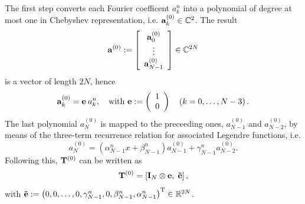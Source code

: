 The first step converts each Fourier coefficent $a_{k}^n$ into a polynomial of degree at most one in Chebyshev representation, i.e. $\mathbf{a}_{k}^{(0)} \in \mathbb{C}^2$. The result 
\[
  \mathbf{a}^{(0)} := 
    \left[\begin{array}{c}
      \mathbf{a}_{0}^{(0)}\\
      \vdots\\
      \mathbf{a}_{N-1}^{(0)}
    \end{array}\right] 
    \in \mathbb{C}^{2N}
\] 
is a vector of length $2N$, hence 
\[ 
  \mathbf{a}_{k}^{(0)} = \mathbf{e} \: a_{k}^n,\quad \text{with } \mathbf{e} := \left(\begin{array}{l}1\\0\end{array}\right) \quad \left(k = 0,\ldots,N-3\right).
\]
The last polynomial $a_{N}^{(0)}$ is mapped to the preceeding ones, $a_{N-1}^{(0)}$ and $a_{N-2}^{(0)}$, by means of the three-term 
recurrence relation for associated Legendre functions, i.e. 
\[
  a_{N}^{(0)} = \left(\alpha_{N-1}^n x + \beta_{N-1}^n\right)a_{N-1}^{(0)} + \gamma_{N-1}^n a_{N-2}^{(0)}.
\]
Following this, $\mathbf{T}^{(0)}$ can be written as 
\[
  \mathbf{T}^{(0)} = \left[\mathbf{I}_{N} \otimes \mathbf{e},\;\mathbf{\tilde{e}}\right],
\]
with $\mathbf{\tilde{e}} := \left(0,0,\dots,0,\gamma_{N-1}^n, 0, \beta_{N-1}^n,\alpha_{N-1}^n\right)^{\text{\rm{T}}} \in \mathbb{R}^{2N}$.

